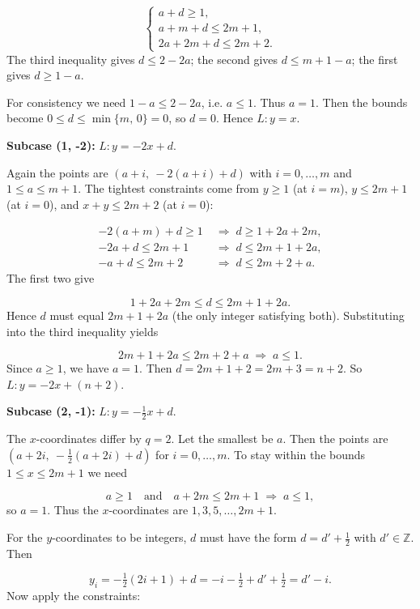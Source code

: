 \[
\begin{cases}
a+d \ge 1,\\
a+m+d \le 2m+1,\\
2a+2m+d \le 2m+2.
\end{cases}
\]
The third inequality gives \(d \le 2-2a\); the second gives \(d \le m+1 - a\); the first gives \(d \ge 1-a\).\par
For consistency we need \(1-a \le 2-2a\), i.e. \(a \le 1\). Thus \(a = 1\). Then the bounds become \(0 \le d \le \min\{m,\,0\} = 0\), so \(d = 0\). Hence \(L: y = x\).\par
\smallskip
\textbf{Subcase (1, -2):} \(L: y = -2x + d\).\par
Again the points are \((a+i,\ -2(a+i)+d)\) with \(i=0,\dots,m\) and \(1 \le a \le m+1\). The tightest constraints come from \(y \ge 1\) (at \(i=m\)), \(y \le 2m+1\) (at \(i=0\)), and \(x+y \le 2m+2\) (at \(i=0\)):\par
\[
\begin{aligned}
-2(a+m)+d \ge 1 \;&\Longrightarrow\; d \ge 1 + 2a + 2m,\\
-2a + d \le 2m+1 \;&\Longrightarrow\; d \le 2m+1 + 2a,\\
-a + d \le 2m+2 \;&\Longrightarrow\; d \le 2m+2 + a.
\end{aligned}
\]
The first two give\par
\[
1+2a+2m \le d \le 2m+1+2a.
\]
Hence \(d\) must equal \(2m+1+2a\) (the only integer satisfying both). Substituting into the third inequality yields\par
\[
2m+1+2a \le 2m+2 + a \;\Longrightarrow\; a \le 1.
\]
Since \(a \ge 1\), we have \(a = 1\). Then \(d = 2m+1+2 = 2m+3 = n+2\). So \(L: y = -2x + (n+2)\).\par
\smallskip
\textbf{Subcase (2, -1):} \(L: y = -\tfrac12 x + d\).\par
The \(x\)-coordinates differ by \(q=2\). Let the smallest be \(a\). Then the points are \((a+2i,\ -\tfrac12(a+2i)+d)\) for \(i=0,\dots,m\). To stay within the bounds \(1 \le x \le 2m+1\) we need\par
\[
a \ge 1 \quad\text{and}\quad a+2m \le 2m+1 \;\Longrightarrow\; a \le 1,
\]
so \(a = 1\). Thus the \(x\)-coordinates are \(1,3,5,\dots,2m+1\).\par
For the \(y\)-coordinates to be integers, \(d\) must have the form \(d = d' + \tfrac12\) with \(d' \in \mathbb Z\). Then\par
\[
y_i = -\tfrac12(2i+1) + d = -i - \tfrac12 + d' + \tfrac12 = d' - i.
\]
Now apply the constraints:\par
